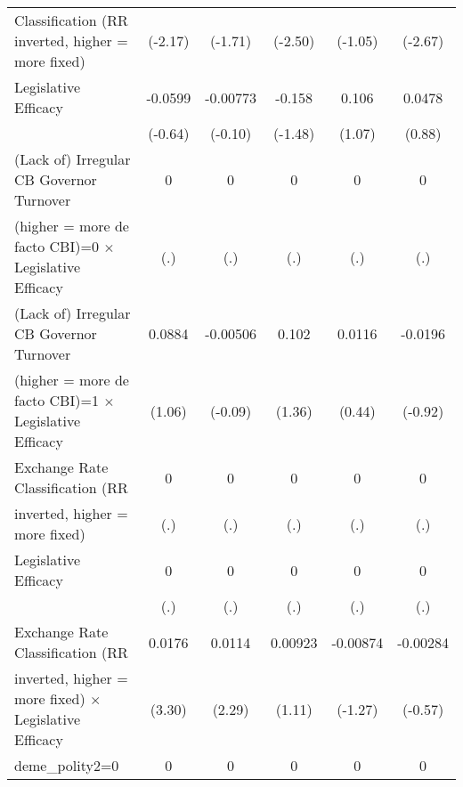 {\begin{tabular}{l*{5}{c}}
Classification (RR inverted, higher = more fixed)&   (-2.17)         &   (-1.71)         &   (-2.50)         &   (-1.05)         &   (-2.67)         \\
\addlinespace
Legislative Efficacy                    &   -0.0599         &  -0.00773         &    -0.158         &     0.106         &    0.0478         \\
                                        &   (-0.64)         &   (-0.10)         &   (-1.48)         &    (1.07)         &    (0.88)         \\
\addlinespace
(Lack of) Irregular CB Governor Turnover&         0         &         0         &         0         &         0         &         0         \\
(higher = more de facto CBI)=0 $\times$ Legislative Efficacy&       (.)         &       (.)         &       (.)         &       (.)         &       (.)         \\
\addlinespace
(Lack of) Irregular CB Governor Turnover&    0.0884         &  -0.00506         &     0.102         &    0.0116         &   -0.0196         \\
(higher = more de facto CBI)=1 $\times$ Legislative Efficacy&    (1.06)         &   (-0.09)         &    (1.36)         &    (0.44)         &   (-0.92)         \\
\addlinespace
Exchange Rate Classification (RR        &         0         &         0         &         0         &         0         &         0         \\
inverted, higher = more fixed)          &       (.)         &       (.)         &       (.)         &       (.)         &       (.)         \\
\addlinespace
Legislative Efficacy                    &         0         &         0         &         0         &         0         &         0         \\
                                        &       (.)         &       (.)         &       (.)         &       (.)         &       (.)         \\
\addlinespace
Exchange Rate Classification (RR        &    0.0176\sym{**} &    0.0114\sym{*}  &   0.00923         &  -0.00874         &  -0.00284         \\
inverted, higher = more fixed) $\times$ Legislative Efficacy&    (3.30)         &    (2.29)         &    (1.11)         &   (-1.27)         &   (-0.57)         \\
\addlinespace
deme\_polity2=0                          &         0         &         0         &         0         &         0         &         0         \\

\end{tabular}}
